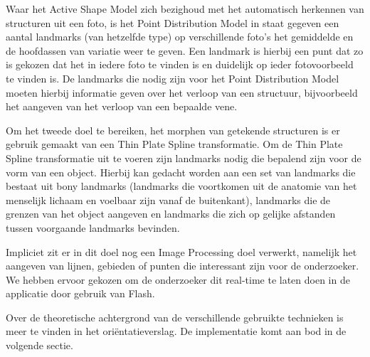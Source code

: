 Waar het Active Shape Model zich bezighoud met het automatisch herkennen van structuren uit een foto, is het Point Distribution Model\cite{pdm} in staat gegeven een aantal landmarks (van hetzelfde type) op verschillende foto's het gemiddelde en de hoofdassen van variatie weer te geven. Een landmark is hierbij een punt dat zo is gekozen dat het in iedere foto te vinden is en duidelijk op ieder fotovoorbeeld te vinden is. De landmarks die nodig zijn voor het Point Distribution Model moeten hierbij informatie geven over het verloop van een structuur, bijvoorbeeld het aangeven van het verloop van een bepaalde vene.

Om het tweede doel te bereiken, het morphen van getekende structuren is er gebruik gemaakt van een Thin Plate Spline transformatie. Om de Thin Plate Spline transformatie uit te voeren zijn landmarks nodig die bepalend zijn voor de vorm van een object. Hierbij kan gedacht worden aan een set van landmarks die bestaat uit bony landmarks (landmarks die voortkomen uit de anatomie van het menselijk lichaam en voelbaar zijn vanaf de buitenkant), landmarks die de grenzen van het object aangeven en landmarks die zich op gelijke afstanden tussen voorgaande landmarks bevinden. 

Impliciet zit er in dit doel nog een Image Processing doel verwerkt, namelijk het aangeven van lijnen, gebieden of punten die interessant zijn voor de onderzoeker. We hebben ervoor gekozen om de onderzoeker dit real-time te laten doen in de applicatie door gebruik van Flash.

Over de theoretische achtergrond van de verschillende gebruikte technieken is meer te vinden in het ori\"{e}ntatieverslag. De implementatie komt aan bod in de volgende sectie. 




